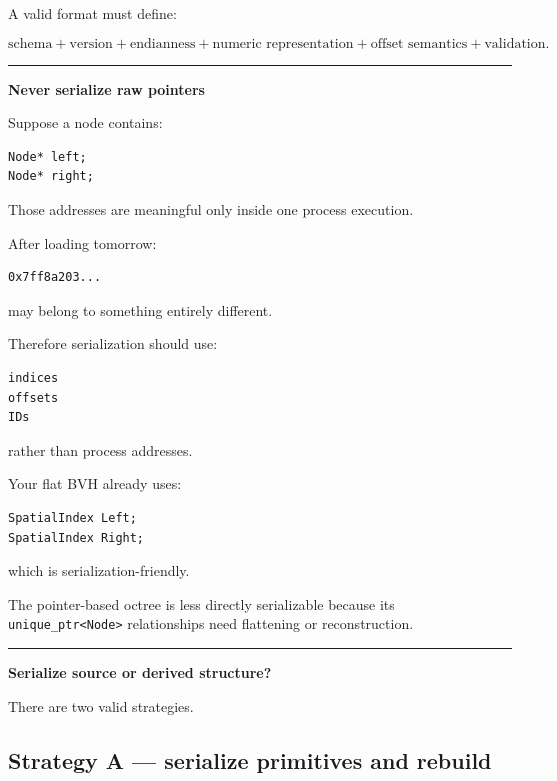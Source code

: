 A valid format must define:

\[
\boxed{
\text{schema}
+
\text{version}
+
\text{endianness}
+
\text{numeric representation}
+
\text{offset semantics}
+
\text{validation}.
}
\]

\begin{center}\rule{0.5\linewidth}{0.5pt}\end{center}

\textbf{Never serialize raw pointers}

Suppose a node contains:

\begin{verbatim}
Node* left;
Node* right;
\end{verbatim}

Those addresses are meaningful only inside one process execution.

After loading tomorrow:

\begin{verbatim}
0x7ff8a203...
\end{verbatim}

may belong to something entirely different.

Therefore serialization should use:

\begin{verbatim}
indices
offsets
IDs
\end{verbatim}

rather than process addresses.

Your flat BVH already uses:

\begin{verbatim}
SpatialIndex Left;
SpatialIndex Right;
\end{verbatim}

which is serialization-friendly.

The pointer-based octree is less directly serializable because its \texttt{unique\_ptr\textless{}Node\textgreater{}} relationships need flattening or reconstruction.

\begin{center}\rule{0.5\linewidth}{0.5pt}\end{center}

\textbf{Serialize source or derived structure?}

There are two valid strategies.

\subsection{Strategy A --- serialize primitives and rebuild}\label{06-engine-ii-ch031-strategy-a-serialize-primitives-and-rebuild}

